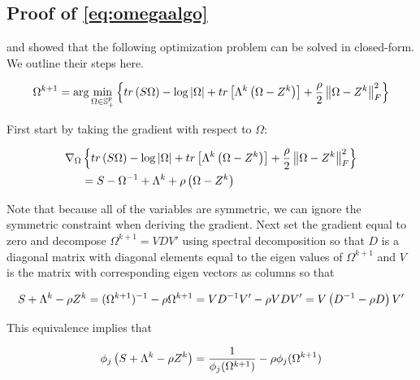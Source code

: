 \documentclass[11pt,]{report}
\theoremstyle{definition}
\theoremstyle{definition}
\theoremstyle{definition}
\theoremstyle{remark}
\begin{document}
\hypertarget{proofomegaalgo}{%
\subsection{Proof of \eqref{eq:omegaalgo}}\label{proofomegaalgo}}

\citet{witten2009covariance} and \citet{price2015ridge} showed that the following optimization problem can be solved in closed-form. We outline their steps here.

\begin{equation}
\Omega^{k + 1} = \arg\min_{\Omega \in \mathbb{S}_{+}^{p}}\left\{ tr\left(S\Omega\right) - \log\left|\Omega\right| + tr\left[\Lambda^{k}\left(\Omega - Z^{k}\right)\right] + \frac{\rho}{2}\left\| \Omega - Z^{k} \right\|_{F}^{2} \right\}
\label{eq:appendixomegaloglik}\notag
\end{equation}

First start by taking the gradient with respect to \(\Omega\):

\begin{equation}
\begin{split}
  \nabla_{\Omega}&\left\{ tr\left(S\Omega\right) - \log\left|\Omega\right| + tr\left[\Lambda^{k}\left(\Omega - Z^{k}\right)\right] + \frac{\rho}{2}\left\| \Omega - Z^{k} \right\|_{F}^{2} \right\} \\
  &= S - \Omega^{-1} + \Lambda^{k} + \rho\left( \Omega - Z^{k} \right)
\label{eq:appendixomegagradient}\notag
\end{split}
\end{equation}

Note that because all of the variables are symmetric, we can ignore the symmetric constraint when deriving the gradient. Next set the gradient equal to zero and decompose \(\Omega^{k + 1} = VDV'\) using spectral decomposition so that \(D\) is a diagonal matrix with diagonal elements equal to the eigen values of \(\Omega^{k + 1}\) and \(V\) is the matrix with corresponding eigen vectors as columns so that

\begin{equation}
S + \Lambda^{k} - \rho Z^{k} = (\Omega^{k + 1})^{-1} - \rho \Omega^{k + 1} = VD^{-1}V' - \rho VDV' =  V\left(D^{-1} - \rho D\right)V'\notag
\end{equation}

This equivalence implies that

\begin{equation}
\phi_{j}\left( S + \Lambda^{k} - \rho Z^{k} \right) = \frac{1}{\phi_{j}(\Omega^{k + 1})} - \rho\phi_{j}(\Omega^{k + 1})\notag
\end{equation}
\end{document}
